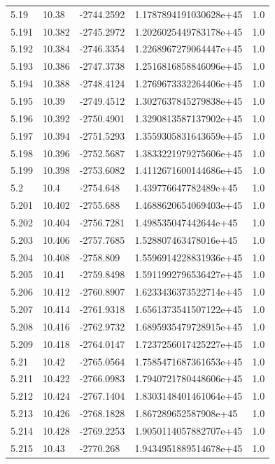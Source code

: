 \begin{tabular}{lllll}
5.19 & 10.38 & -2744.2592 & 1.1787894191030628e+45 & 1.0 \\
5.191 & 10.382 & -2745.2972 & 1.2026025449783178e+45 & 1.0 \\
5.192 & 10.384 & -2746.3354 & 1.2268967279064447e+45 & 1.0 \\
5.193 & 10.386 & -2747.3738 & 1.2516816858846096e+45 & 1.0 \\
5.194 & 10.388 & -2748.4124 & 1.2769673332264406e+45 & 1.0 \\
5.195 & 10.39 & -2749.4512 & 1.3027637845279838e+45 & 1.0 \\
5.196 & 10.392 & -2750.4901 & 1.3290813587137902e+45 & 1.0 \\
5.197 & 10.394 & -2751.5293 & 1.3559305831643659e+45 & 1.0 \\
5.198 & 10.396 & -2752.5687 & 1.3833221979275606e+45 & 1.0 \\
5.199 & 10.398 & -2753.6082 & 1.4112671600144686e+45 & 1.0 \\
5.2 & 10.4 & -2754.648 & 1.439776647782489e+45 & 1.0 \\
5.201 & 10.402 & -2755.688 & 1.4688620654069403e+45 & 1.0 \\
5.202 & 10.404 & -2756.7281 & 1.498535047442644e+45 & 1.0 \\
5.203 & 10.406 & -2757.7685 & 1.528807463478016e+45 & 1.0 \\
5.204 & 10.408 & -2758.809 & 1.5596914228831936e+45 & 1.0 \\
5.205 & 10.41 & -2759.8498 & 1.5911992796536427e+45 & 1.0 \\
5.206 & 10.412 & -2760.8907 & 1.6233436373522714e+45 & 1.0 \\
5.207 & 10.414 & -2761.9318 & 1.6561373541507122e+45 & 1.0 \\
5.208 & 10.416 & -2762.9732 & 1.6895935479728915e+45 & 1.0 \\
5.209 & 10.418 & -2764.0147 & 1.7237256017425227e+45 & 1.0 \\
5.21 & 10.42 & -2765.0564 & 1.7585471687361653e+45 & 1.0 \\
5.211 & 10.422 & -2766.0983 & 1.7940721780448606e+45 & 1.0 \\
5.212 & 10.424 & -2767.1404 & 1.8303148401461064e+45 & 1.0 \\
5.213 & 10.426 & -2768.1828 & 1.867289652587908e+45 & 1.0 \\
5.214 & 10.428 & -2769.2253 & 1.9050114057882707e+45 & 1.0 \\
5.215 & 10.43 & -2770.268 & 1.9434951889514678e+45 & 1.0 \\

\end{tabular}
